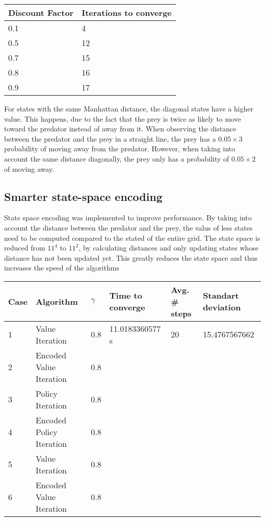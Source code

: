 \documentclass{article}
\begin{document}


\begin{center}
	\begin{tabular}{ l || l }
		Discount Factor & Iterations to converge \\ 
		\hline
		0.1 & 4 \\
		0.5 & 12 \\
		0.7 & 15 \\
		0.8 & 16 \\
		0.9 & 17 \\	
	\end{tabular}
\end{center}

For states with the same Manhattan distance, the diagonal states have a higher value. This happens, due to the fact that the prey is twice as likely to move toward the predator instead of away from it. When observing the distance between the predator and the prey in a straight line, the prey has a $0.05 \times 3$ probability of moving away from the predator. However, when taking into account the same distance diagonally, the prey only has a probability of $0.05 \times 2$ of moving away.

\subsection*{Smarter state-space encoding}
State space encoding was implemented to improve performance. By taking into account the distance between the predator and the prey, the valus of less states need to be computed compared to the stated of the entire grid. The  state space is reduced from $11^4$ to $11^2$, by calculating distances and only updating states whose distance has not been updated yet. This greatly reduces the state space and thus increases the speed of the algorithms




\begin{center}
	\begin{tabular}{ |l | l | l | l | l | l| }
		Case & Algorithm & $\gamma$ & Time to converge & Avg. \# steps & Standart deviation \\ 
		\hline
		1  & Value Iteration & 0.8 & 11.0183360577 s & 20 & 15.4767567662 \\
		2  & Encoded Value Iteration & 0.8 &  & &  \\
		3  & Policy Iteration & 0.8 & & &  \\
		4  & Encoded Policy Iteration & 0.8 & & & \\	
		5  & Value Iteration & 0.8 & & & \\	
		6  & Encoded Value Iteration & 0.8 & & & \\	
	\end{tabular}
\end{center}
\end{document}
